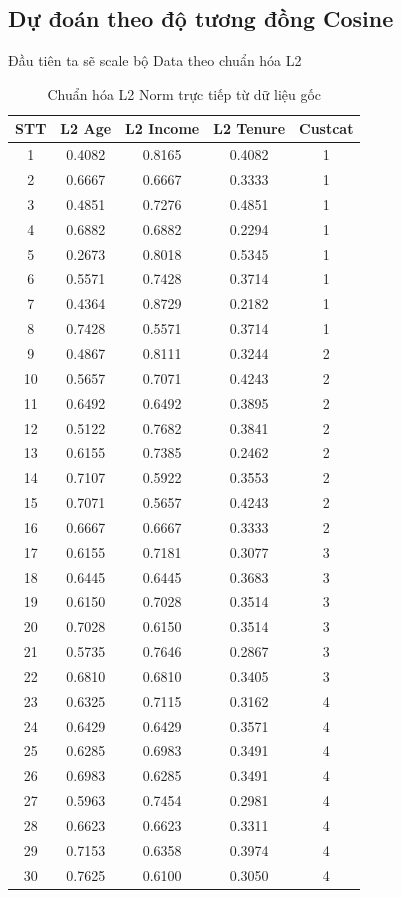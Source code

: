 \documentclass[12pt,a4paper]{article}
\begin{document}
\subsection{Dự đoán theo độ tương đồng Cosine}
Đầu tiên ta sẽ scale bộ Data theo chuẩn hóa L2
\begin{table}[H]
\centering
\begin{tabular}{|c|c|c|c|c|}
\hline
\textbf{STT} & \textbf{L2 Age} & \textbf{L2 Income} & \textbf{L2 Tenure} & \textbf{Custcat} \\ \hline
1  & 0.4082 & 0.8165 & 0.4082 & 1 \\ \hline
2  & 0.6667 & 0.6667 & 0.3333 & 1 \\ \hline
3  & 0.4851 & 0.7276 & 0.4851 & 1 \\ \hline
4  & 0.6882 & 0.6882 & 0.2294 & 1 \\ \hline
5  & 0.2673 & 0.8018 & 0.5345 & 1 \\ \hline
6  & 0.5571 & 0.7428 & 0.3714 & 1 \\ \hline
7  & 0.4364 & 0.8729 & 0.2182 & 1 \\ \hline
8  & 0.7428 & 0.5571 & 0.3714 & 1 \\ \hline
9  & 0.4867 & 0.8111 & 0.3244 & 2 \\ \hline
10 & 0.5657 & 0.7071 & 0.4243 & 2 \\ \hline
11 & 0.6492 & 0.6492 & 0.3895 & 2 \\ \hline
12 & 0.5122 & 0.7682 & 0.3841 & 2 \\ \hline
13 & 0.6155 & 0.7385 & 0.2462 & 2 \\ \hline
14 & 0.7107 & 0.5922 & 0.3553 & 2 \\ \hline
15 & 0.7071 & 0.5657 & 0.4243 & 2 \\ \hline
16 & 0.6667 & 0.6667 & 0.3333 & 2 \\ \hline
17 & 0.6155 & 0.7181 & 0.3077 & 3 \\ \hline
18 & 0.6445 & 0.6445 & 0.3683 & 3 \\ \hline
19 & 0.6150 & 0.7028 & 0.3514 & 3 \\ \hline
20 & 0.7028 & 0.6150 & 0.3514 & 3 \\ \hline
21 & 0.5735 & 0.7646 & 0.2867 & 3 \\ \hline
22 & 0.6810 & 0.6810 & 0.3405 & 3 \\ \hline
23 & 0.6325 & 0.7115 & 0.3162 & 4 \\ \hline
24 & 0.6429 & 0.6429 & 0.3571 & 4 \\ \hline
25 & 0.6285 & 0.6983 & 0.3491 & 4 \\ \hline
26 & 0.6983 & 0.6285 & 0.3491 & 4 \\ \hline
27 & 0.5963 & 0.7454 & 0.2981 & 4 \\ \hline
28 & 0.6623 & 0.6623 & 0.3311 & 4 \\ \hline
29 & 0.7153 & 0.6358 & 0.3974 & 4 \\ \hline
30 & 0.7625 & 0.6100 & 0.3050 & 4 \\ \hline
\end{tabular}
\caption{Chuẩn hóa L2 Norm trực tiếp từ dữ liệu gốc}
\end{table}
\end{document}
